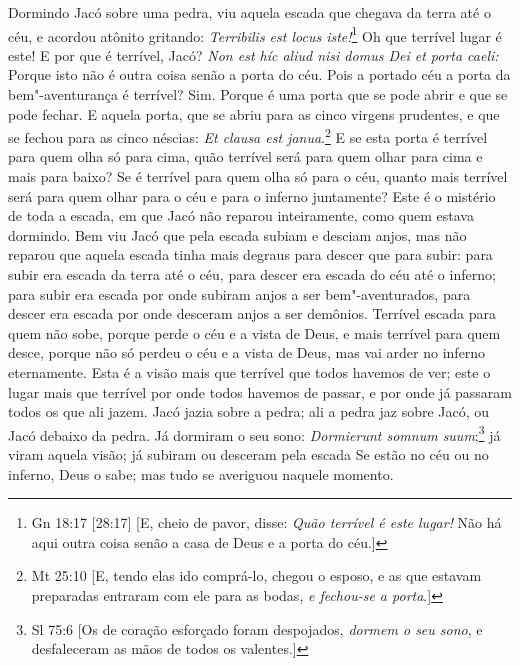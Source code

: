 Dormindo Jacó sobre uma pedra, viu aquela escada que chegava da terra
até o céu, e acordou atônito gritando: \emph{Terribilis est locus iste!}\footnote{Gn 18:17 [28:17] [E, cheio de pavor, disse: \emph{Quão terrível é este lugar!} Não há aqui outra coisa
senão a casa de Deus e a porta do céu.]}
Oh que terrível lugar é este! E por que é terrível, Jacó?
\emph{Non est híc aliud nisi domus Dei et porta caeli:} Porque isto não
é outra coisa senão a porta do céu. Pois a portado céu a porta da
bem"-aventurança é terrível? Sim. Porque é uma porta que se pode abrir e
que se pode fechar. E aquela porta, que se abriu para as cinco virgens
prudentes, e que se fechou para as cinco néscias: \emph{Et clausa est
janua}.\footnote{Mt 25:10 [E, tendo elas ido comprá-lo, chegou o esposo, e as que estavam preparadas entraram com ele para as bodas, \emph{e fechou-se a porta}.]} E se esta porta é terrível para quem olha só para
cima, quão terrível será para quem olhar para cima e mais para baixo? Se
é terrível para quem olha só para o céu, quanto mais terrível será para
quem olhar para o céu e para o inferno juntamente? Este é o mistério de
toda a escada, em que Jacó não reparou inteiramente, como quem estava
dormindo. Bem viu Jacó que pela escada subiam e desciam anjos, mas não
reparou que aquela escada tinha mais degraus para descer que para subir:
para subir era escada da terra até o céu, para descer era escada do céu
até o inferno; para subir era escada por onde subiram anjos a ser bem"-aventurados, para descer era escada por onde desceram anjos a ser
demônios. Terrível escada para quem não sobe, porque perde o céu e a
vista de Deus, e mais terrível para quem desce, porque não só perdeu o
céu e a vista de Deus, mas vai arder no inferno eternamente. Esta é a
visão mais que terrível que todos havemos de ver; este o lugar mais que
terrível por onde todos havemos de passar, e por onde já passaram todos
os que ali jazem. Jacó jazia sobre a pedra; ali a pedra jaz sobre Jacó,
ou Jacó debaixo da pedra. Já dormiram o seu sono: \emph{Dormierunt
somnum suum};\footnote{Sl 75:6 [Os de coração esforçado foram despojados, \emph{dormem o seu sono}, e desfaleceram as mãos de todos os valentes.]} já viram aquela visão; já subiram ou desceram pela escada Se estão no céu ou no inferno, Deus o sabe; mas tudo se
averiguou naquele momento.

